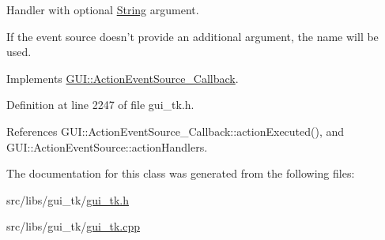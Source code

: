 Handler with optional \hyperlink{classGUI_1_1String}{String} argument. 

If the event source doesn't provide an additional argument, the name will be used. 

Implements \hyperlink{structGUI_1_1ActionEventSource__Callback_a36df23a424558a83b45e3e3d5c175cf2}{G\-U\-I\-::\-Action\-Event\-Source\-\_\-\-Callback}.



Definition at line 2247 of file gui\-\_\-tk.\-h.



References G\-U\-I\-::\-Action\-Event\-Source\-\_\-\-Callback\-::action\-Executed(), and G\-U\-I\-::\-Action\-Event\-Source\-::action\-Handlers.



The documentation for this class was generated from the following files\-:\begin{DoxyCompactItemize}
\item 
src/libs/gui\-\_\-tk/\hyperlink{gui__tk_8h}{gui\-\_\-tk.\-h}\item 
src/libs/gui\-\_\-tk/\hyperlink{gui__tk_8cpp}{gui\-\_\-tk.\-cpp}\end{DoxyCompactItemize}
